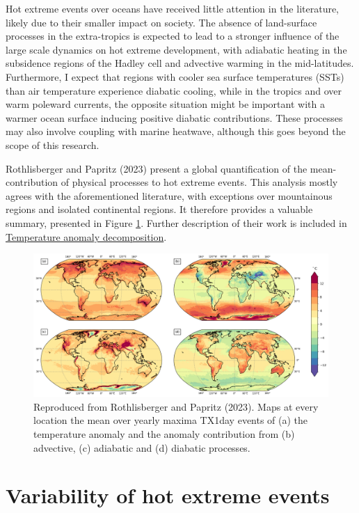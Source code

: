 \documentclass[11pt,a4paper,twoside,openright]{report}
\theoremstyle{definition}
\begin{document}
Hot extreme events over oceans have received little attention in the literature, likely due to their smaller impact on society. The absence of land-surface processes in the extra-tropics is expected to lead to a stronger influence of the large scale dynamics on hot extreme development, with adiabatic heating in the subsidence regions of the Hadley cell and advective warming in the mid-latitudes. Furthermore, I expect that regions with cooler sea surface temperatures (SSTs) than air temperature experience diabatic cooling, while in the tropics and over warm poleward currents, the opposite situation might be important with a warmer ocean surface inducing positive diabatic contributions. These processes may also involve coupling with marine heatwave, although this goes beyond the scope of this research.

Rothlisberger and Papritz (2023) present a global quantification of the mean-contribution of physical processes to hot extreme events. This analysis mostly agrees with the aforementioned literature, with exceptions over mountainous regions and isolated continental regions. It therefore provides a valuable summary, presented in Figure \ref{fig:decompmean}. Further description of their work is included in \hyperref[temperature-anomaly-decomposition]{Temperature anomaly decomposition}.

\begin{figure}
\includegraphics[width=1\linewidth]{images/mean_contribution} \caption{Reproduced from Rothlisberger and Papritz (2023). Maps at every location the mean over yearly maxima TX1day events of (a) the temperature anomaly and the anomaly contribution from (b) advective, (c) adiabatic and (d) diabatic processes.}\label{fig:decompmean}
\end{figure}

\section{Variability of hot extreme events}\label{variability-of-hot-extreme-events}
\end{document}

